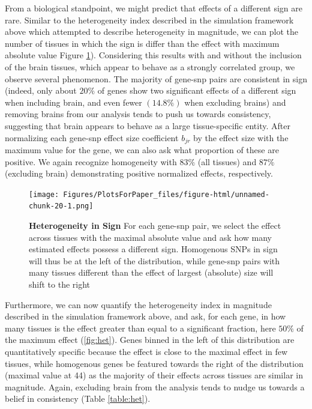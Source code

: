  From a biological standpoint, we might predict that effects of a different sign are rare. Similar to the heterogeneity index described in the simulation framework above which attempted to describe heterogeneity in magnitude, we can plot the number of tissues in which the sign is differ than the effect with maximum absolute value Figure \ref{fig:signhet}). Considering this results with and without the inclusion of the brain tissues, which appear to behave as a strongly correlated group, we observe several phenomenon. The majority of gene-snp pairs are consistent in sign (indeed, only about $20\%$ of genes show two significant effects of a different sign when including brain, and even fewer $(14.8\%)$ when excluding brains) and removing brains from our analysis tends to push us towards consistency, suggesting that brain appears to behave as a large tissue-specific entity. After normalizing each gene-snp effect size coefficient $b_{jr}$ by the effect size with the maximum value for the gene, we can also ask what proportion of these are positive. We again recognize homogeneity with $83\%$ (all tissues) and $87\%$  (excluding brain) demonstrating positive normalized effects, respectively. \newline


\newline
\begin{figure}[htbp]
\texttt{[image: Figures/PlotsForPaper\_files/figure-html/unnamed-chunk-20-1.png]}\\
\caption{\textbf{Heterogeneity in Sign} For each gene-snp pair, we select the effect across tissues with the maximal absolute value and ask how many estimated effects possess a different sign. Homogenous SNPs in sign will thus be at the left of the distribution, while gene-snp pairs with many tissues different than the effect of largest (absolute) size will shift to the right}
\label{fig:signhet}
\end{figure}\newline

Furthermore, we can now quantify the heterogeneity index in magnitude described in the simulation framework above, and ask, for each gene, in how many tissues is the effect greater than equal to a significant fraction, here $50\%$ of the maximum effect (\ref{fig:het}). Genes binned in the left of this distribution are quantitatively specific because the effect is close to the maximal effect in few tissues, while homogenous genes be featured towards the right of the distribution (maximal value at 44) as the majority of their effects across tissues are similar in magnitude. Again, excluding brain from the analysis tends to nudge us towards a belief in consistency (Table \ref{table:het}).

